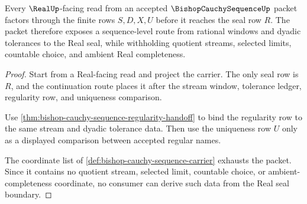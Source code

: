 \begin{theorem}
\label{thm:bishop-cauchy-sequence-real-seal-boundary}
Every $\RealUp$-facing read from an accepted $\BishopCauchySequenceUp$ packet factors through the finite rows $S,D,X,U$ before it reaches the seal row $R$. The packet therefore exposes a sequence-level route from rational windows and dyadic tolerances to the Real seal, while withholding quotient streams, selected limits, countable choice, and ambient Real completeness.
\end{theorem}
\begin{proof}
Start from a Real-facing read and project the carrier. The only seal row is $R$, and the continuation route places it after the stream window, tolerance ledger, regularity row, and uniqueness comparison.

Use \autoref{thm:bishop-cauchy-sequence-regularity-handoff} to bind the regularity row to the same stream and dyadic tolerance data. Then use the uniqueness row $U$ only as a displayed comparison between accepted regular names.

The coordinate list of \autoref{def:bishop-cauchy-sequence-carrier} exhausts the packet. Since it contains no quotient stream, selected limit, countable choice, or ambient-completeness coordinate, no consumer can derive such data from the Real seal boundary.
\end{proof}


\begin{closurestatus}{\BishopCauchySequenceUp}
  \theoryclosure{\seedClosure}
  \formalstatus{\unformalizedV}
\end{closurestatus}

